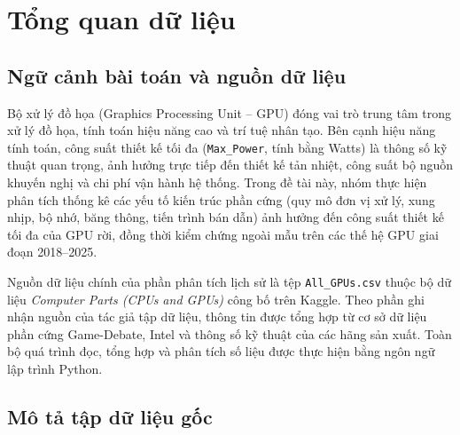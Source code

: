 %
%   

\section{Tổng quan dữ liệu}
\label{sec:overview}

\subsection{Ngữ cảnh bài toán và nguồn dữ liệu}

Bộ xử lý đồ họa (Graphics Processing Unit -- GPU) đóng vai trò trung tâm trong xử lý đồ
họa, tính toán hiệu năng cao và trí tuệ nhân tạo. Bên cạnh hiệu năng tính toán, công suất
thiết kế tối đa (\texttt{Max\_Power}, tính bằng Watts) là thông số kỹ thuật quan trọng,
ảnh hưởng trực tiếp đến thiết kế tản nhiệt, công suất bộ nguồn khuyến nghị và chi phí vận
hành hệ thống. Trong đề tài này, nhóm thực hiện phân tích thống kê các yếu tố kiến trúc
phần cứng (quy mô đơn vị xử lý, xung nhịp, bộ nhớ, băng thông, tiến trình bán dẫn) ảnh
hưởng đến công suất thiết kế tối đa của GPU rời, đồng thời kiểm chứng ngoài mẫu trên các
thế hệ GPU giai đoạn 2018--2025.

Nguồn dữ liệu chính của phần phân tích lịch sử là tệp \texttt{All\_GPUs.csv} thuộc bộ dữ
liệu \textit{Computer Parts (CPUs and GPUs)} công bố trên Kaggle. Theo phần ghi nhận
nguồn của tác giả tập dữ liệu, thông tin được tổng hợp từ cơ sở dữ liệu phần cứng
Game-Debate, Intel và thông số kỹ thuật của các hãng sản xuất. Toàn bộ quá trình đọc,
tổng hợp và phân tích số liệu được thực hiện bằng ngôn ngữ lập trình Python.

\subsection{Mô tả tập dữ liệu gốc}

